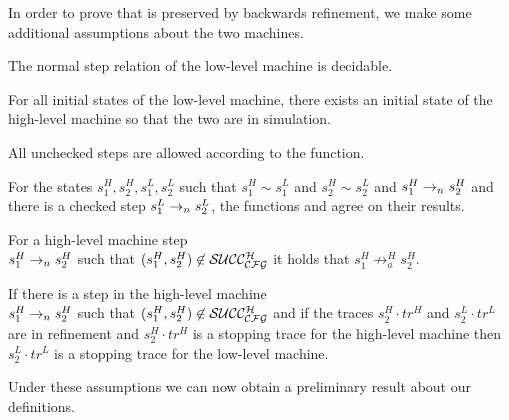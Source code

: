 In order to prove that \CFI is preserved by backwards refinement, we
make some additional assumptions about the two machines.

\begin{definition}
\label{step_classic}
The normal step relation of the low-level machine is decidable.
\end{definition}

\begin{definition}
\label{initial_refine}
For all initial states of the low-level machine, there exists an
initial state of the high-level machine so that the two are in
simulation.
\end{definition}

\begin{definition}
\label{cfg_nocheck}
All unchecked steps are allowed according to the \SUCC{} function.
\end{definition}

\begin{definition}
\label{cfg_equiv}
For the states $s^{H}_1, s^{H}_2, s^L_1, s^{L}_2$ such that $s^{H}_1
\sim s^{L}_1$ and $s^H_2 \sim s^L_2$ and $s^{H}_1\to_ns^H_2$ and
there is a checked step $s^{L}_1\to_ns^L_2$, the functions
 and  agree on their results.
\end{definition}

\begin{definition}
\label{av_no_attacker}
For a high-level machine step\\ $s^H_1\to_ns^H_2$ such that
$(s^H_1,s^H_2) \not \in \mathcal{SUCC_\mathcal{CFG}^{H}}$ it holds that $s^H_1 \not \to^H_a
s^H_2$.
\end{definition}

\begin{definition}
\label{as_implies_cs}
If there is a step in the high-level machine\\ $s^H_1\to_ns^H_2$
such that $(s^H_1,s^H_2) \not \in \mathcal{SUCC_\mathcal{CFG}^{H}}$ and if the traces $s^H_2
\cdot tr^H$ and $s^L_2 \cdot tr^L$ are in refinement and $s^H_2 \cdot tr^H$ is
a stopping trace for the high-level machine then $s^L_2 \cdot tr^L$ is a
stopping trace for the low-level machine.
\end{definition}

Under these assumptions we can now obtain a preliminary result about
our \CFI definitions.

